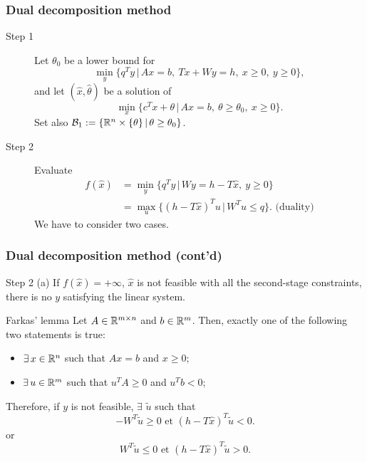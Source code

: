 \documentclass{beamer}
\begin{document}
\begin{frame}
\frametitle{Dual decomposition method}

\begin{description}
\item[\red Step 1]
Let $\theta_0$ be a lower bound for
\[
\min_y \lbrace q^Ty \,|\, Ax = b,\ Tx+Wy = h,\ x \geq 0,\ y \geq 0 \rbrace,
\]
and let $(\hat{x}, \hat{\theta})$ be a solution of
\[
\min_x \lbrace c^Tx + \theta \,|\, Ax = b,\ \theta \geq \theta_0,\ x
\geq 0 \rbrace.
\]
Set also $\mathcal{B}_1 := \lbrace \mathbb{R}^n \times \lbrace \theta \rbrace
\,|\, \theta \geq \theta_0 \rbrace$.
\item[\red Step 2]
Evaluate
\begin{align*}
f(\hat{x}) &= \min_y \lbrace q^Ty \,|\, Wy = h-T\hat{x},\ y \geq 0
\rbrace \\
&= \max_u \lbrace (h-T\hat{x})^Tu \,|\, W^Tu \leq q \rbrace. \mbox{ (duality)}
\end{align*}
We have to consider two cases.
\end{description}
\end{frame}

\begin{frame}
\frametitle{Dual decomposition method (cont'd)}

{\red Step 2 (a)}
If $f(\hat{x}) = +\infty$, $\hat{x}$ is not feasible with all the second-stage constraints, there is no $y$ satisfying the linear system.

\mbox{}

\begin{block}{Farkas' lemma}
Let $A \in \mathbb{R}^{m \times n}$ and $b \in \mathbb{R}^m$.
Then, exactly one of the following two statements is true:
\begin{itemize}
\item
$\exists\, x \in \mathbb{R}^n$ such that $Ax = b$ and $x \geq 0$;
\item
$\exists\, u \in \mathbb{R}^m$ such that $u^T A \geq 0$ and $u^T b < 0$;
\end{itemize}
\end{block}
	
\mbox{}

Therefore, if $y$ is not feasible, $\exists$ $\tilde{u}$ such that
\[
-W^T\tilde{u} \geq 0 \mbox{ et } (h - T\hat{x})^T \tilde{u} < 0.
\]
or
\[
W^T\tilde{u} \leq 0 \mbox{ et } (h - T\hat{x})^T \tilde{u} > 0.
\]

\end{frame}
\end{document}
